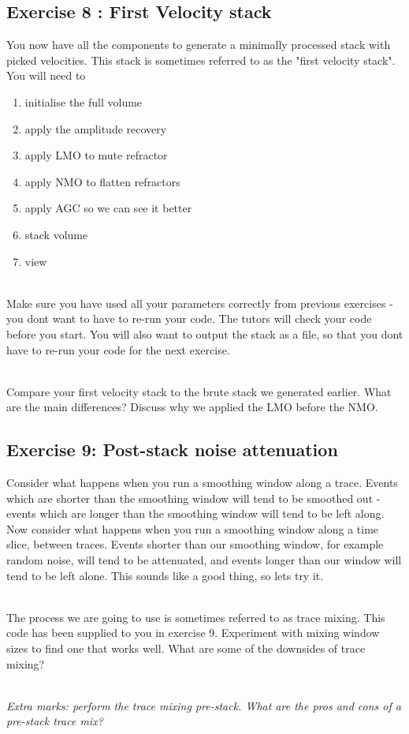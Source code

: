 \subsection*{Exercise 8 : First Velocity stack}
You now have all the components to generate a minimally processed stack with picked velocities.  This stack is sometimes referred to as the "first velocity stack".  You will need to
\begin{enumerate}
\item initialise the full volume
\item apply the amplitude recovery
\item apply LMO to mute refractor
\item apply NMO to flatten refractors
\item apply AGC so we can see it better
\item stack volume
\item view
\end{enumerate}
\par~\\
Make sure you have used all your parameters correctly from previous exercises - you dont want to have to re-run your code.  The tutors will check your code before you start.  You will also want to output the stack as a file, so that you dont have to re-run your code for the next exercise.
\par~\\
Compare your first velocity stack to the brute stack we generated earlier. What are the main differences?  Discuss why we applied the LMO before the NMO.

\subsection*{Exercise 9: Post-stack noise attenuation}
Consider what happens when you run a smoothing window along a trace.  Events which are shorter than the smoothing window will tend to be smoothed out - events which are longer than the smoothing window will tend to be left along. Now consider what happens when you run a smoothing window along a time slice, between traces.  Events shorter than our smoothing window, for example random noise, will tend to be attenuated, and events longer than our window will tend to be left alone. This sounds like a good thing, so lets try it.
\par~\\
The process we are going to use is sometimes referred to as trace mixing. This code has been supplied to you in exercise 9. Experiment with mixing window sizes to find one that works well.  What are some of the downsides of trace mixing?
\par~\\
\emph{Extra marks: perform the trace mixing pre-stack.  What are the pros and cons of a pre-stack trace mix?}


\newpage











